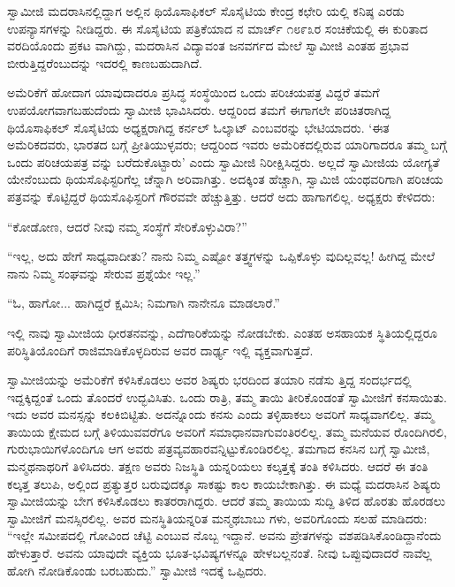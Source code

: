 ಸ್ವಾಮೀಜಿ ಮದರಾಸಿನಲ್ಲಿದ್ದಾಗ ಅಲ್ಲಿನ ಥಿಯೊಸಾಫಿಕಲ್ ಸೊಸೈಟಿಯ ಕೇಂದ್ರ ಕಛೇರಿ ಯಲ್ಲಿ ಕನಿಷ್ಠ ಎರಡು ಉಪನ್ಯಾಸಗಳನ್ನು ನೀಡಿದ್ದರು. ಈ ಸೊಸೈಟಿಯ ಪತ್ರಿಕೆಯಾದ ನ ಮಾರ್ಚ್ ೧೮೯೩ರ ಸಂಚಿಕೆಯಲ್ಲಿ ಈ ಕುರಿತಾದ ವರದಿಯೊಂದು ಪ್ರಕಟ ವಾಗಿದ್ದು, ಮದರಾಸಿನ ವಿದ್ಯಾವಂತ ಜನವರ್ಗದ ಮೇಲೆ ಸ್ವಾಮೀಜಿ ಎಂತಹ ಪ್ರಭಾವ ಬೀರುತ್ತಿದ್ದರೆಂಬುದನ್ನು ಇದರಲ್ಲಿ ಕಾಣಬಹುದಾಗಿದೆ.

ಅಮೆರಿಕೆಗೆ ಹೋದಾಗ ಯಾವುದಾದರೂ ಪ್ರಸಿದ್ಧ ಸಂಸ್ಥೆಯಿಂದ ಒಂದು ಪರಿಚಯಪತ್ರ ವಿದ್ದರೆ ತಮಗೆ ಉಪಯೋಗವಾಗಬಹುದೆಂದು ಸ್ವಾಮೀಜಿ ಭಾವಿಸಿದರು. ಆದ್ದರಿಂದ ತಮಗೆ ಈಗಾಗಲೇ ಪರಿಚಿತರಾಗಿದ್ದ ಥಿಯೊಸಾಫಿಕಲ್ ಸೊಸೈಟಿಯ ಅಧ್ಯಕ್ಷರಾಗಿದ್ದ ಕರ್ನಲ್ ಓಲ್ಕಾಟ್ ಎಂಬವರನ್ನು ಭೇಟಿಯಾದರು. ‘ಈತ ಅಮೆರಿಕದವರು, ಭಾರತದ ಬಗ್ಗೆ ಪ್ರೀತಿಯುಳ್ಳವರು; ಆದ್ದರಿಂದ ಇವರು ಅಮೆರಿಕದಲ್ಲಿರುವ ಯಾರಿಗಾದರೂ ತಮ್ಮ ಬಗ್ಗೆ ಒಂದು ಪರಿಚಯಪತ್ರ ವನ್ನು ಬರೆದುಕೊಟ್ಟಾರು’ ಎಂದು ಸ್ವಾಮೀಜಿ ನಿರೀಕ್ಷಿಸಿದ್ದರು. ಅಲ್ಲದೆ ಸ್ವಾಮೀಜಿಯ ಯೋಗ್ಯತೆ ಯೇನೆಂಬುದು ಥಿಯಸೊಫಿಸ್ಟರಿಗೆಲ್ಲ ಚೆನ್ನಾಗಿ ಅರಿವಾಗಿತ್ತು. ಅದಕ್ಕಿಂತ ಹೆಚ್ಚಾಗಿ, ಸ್ವಾಮಿಜಿ ಯಂಥವರಿಗಾಗಿ ಪರಿಚಯ ಪತ್ರವನ್ನು ಕೊಟ್ಟಿದ್ದರೆ ಥಿಯಸೊಫಿಸ್ಟರಿಗೆ ಗೌರವವೇ ಹೆಚ್ಚುತ್ತಿತ್ತು. ಆದರೆ ಅದು ಹಾಗಾಗಲಿಲ್ಲ. ಅಧ್ಯಕ್ಷರು ಕೇಳಿದರು:

“ಕೋಡೋಣ, ಆದರೆ ನೀವು ನಮ್ಮ ಸಂಸ್ಥೆಗೆ ಸೇರಿಕೊಳ್ಳುವಿರಾ?”

“ಇಲ್ಲ, ಅದು ಹೇಗೆ ಸಾಧ್ಯವಾದೀತು? ನಾನು ನಿಮ್ಮ ಎಷ್ಟೋ ತತ್ತ್ವಗಳನ್ನು ಒಪ್ಪಿಕೊಳ್ಳು ವುದಿಲ್ಲವಲ್ಲ! ಹೀಗಿದ್ದ ಮೇಲೆ ನಾನು ನಿಮ್ಮ ಸಂಘವನ್ನು ಸೇರುವ ಪ್ರಶ್ನೆಯೇ ಇಲ್ಲ.”

“ಓ, ಹಾಗೋ... ಹಾಗಿದ್ದರೆ ಕ್ಷಮಿಸಿ; ನಿಮಗಾಗಿ ನಾನೇನೂ ಮಾಡಲಾರೆ.”

ಇಲ್ಲಿ ನಾವು ಸ್ವಾಮೀಜಿಯ ಧೀರತನವನ್ನು, ಎದೆಗಾರಿಕೆಯನ್ನು ನೋಡಬೇಕು. ಎಂತಹ ಅಸಹಾಯಕ ಸ್ಥಿತಿಯಲ್ಲಿದ್ದರೂ ಪರಿಸ್ಥಿತಿಯೊಂದಿಗೆ ರಾಜಿಮಾಡಿಕೊಳ್ಳದಿರುವ ಅವರ ದಾರ್ಢ್ಯ ಇಲ್ಲಿ ವ್ಯಕ್ತವಾಗುತ್ತದೆ.

ಸ್ವಾಮೀಜಿಯನ್ನು ಅಮೆರಿಕೆಗೆ ಕಳಿಸಿಕೊಡಲು ಅವರ ಶಿಷ್ಯರು ಭರದಿಂದ ತಯಾರಿ ನಡೆಸು ತ್ತಿದ್ದ ಸಂದರ್ಭದಲ್ಲಿ ಇದ್ದಕ್ಕಿದ್ದಂತೆ ಒಂದು ತೊಂದರೆ ಉದ್ಭವಿಸಿತು. ಒಂದು ರಾತ್ರಿ, ತಮ್ಮ ತಾಯಿ ತೀರಿಕೊಂಡಂತೆ ಸ್ವಾಮೀಜಿಗೆ ಕನಸಾಯಿತು. ಇದು ಅವರ ಮನಸ್ಸನ್ನು ಕಲಕಿಬಿಟ್ಟಿತು. ಅದನ್ನೊಂದು ಕನಸು ಎಂದು ತಳ್ಳಿಹಾಕಲು ಅವರಿಗೆ ಸಾಧ್ಯವಾಗಲಿಲ್ಲ. ತಮ್ಮ ತಾಯಿಯ ಕ್ಷೇಮದ ಬಗ್ಗೆ ತಿಳಿಯುವವರೆಗೂ ಅವರಿಗೆ ಸಮಾಧಾನವಾಗುವಂತಿರಲಿಲ್ಲ. ತಮ್ಮ ಮನೆಯವ ರೊಂದಿಗಿರಲಿ, ಗುರುಭಾಯಿಗಳೊಂದಿಗೂ ಆಗ ಅವರು ಪತ್ರವ್ಯವಹಾರವನ್ನಿಟ್ಟುಕೊಂಡಿರಲಿಲ್ಲ. ತಮಗಾದ ಕನಸಿನ ಬಗ್ಗೆ ಸ್ವಾಮೀಜಿ, ಮನ್ಮಥನಾಥರಿಗೆ ತಿಳಿಸಿದರು. ತಕ್ಷಣ ಅವರು ನಿಜಸ್ಥಿತಿ ಯನ್ನರಿಯಲು ಕಲ್ಕತ್ತಕ್ಕೆ ತಂತಿ ಕಳಿಸಿದರು. ಆದರೆ ಈ ತಂತಿ ಕಲ್ಕತ್ತ ತಲುಪಿ, ಅಲ್ಲಿಂದ ಪ್ರತ್ಯುತ್ತರ ಬರುವುದಕ್ಕೂ ಸಾಕಷ್ಟು ಕಾಲ ಕಾಯಬೇಕಾಗಿತ್ತು. ಈ ಮಧ್ಯೆ ಮದರಾಸಿನ ಶಿಷ್ಯರು ಸ್ವಾಮೀಜಿಯನ್ನು ಬೇಗ ಕಳಿಸಿಕೊಡಲು ಕಾತರರಾಗಿದ್ದರು. ಆದರೆ ತಮ್ಮ ತಾಯಿಯ ಸುದ್ದಿ ತಿಳಿದ ಹೊರತು ಹೊರಡಲು ಸ್ವಾಮೀಜಿಗೆ ಮನಸ್ಸಿರಲಿಲ್ಲ. ಅವರ ಮನಸ್ಥಿತಿಯನ್ನರಿತ ಮನ್ಮಥಬಾಬು ಗಳು, ಅವರಿಗೊಂದು ಸಲಹೆ ಮಾಡಿದರು: “ಇಲ್ಲೇ ಸಮೀಪದಲ್ಲಿ ಗೋವಿಂದ ಚೆಟ್ಟಿ ಎಂಬುವ ನೊಬ್ಬ ಇದ್ದಾನೆ. ಅವನು ಪ್ರೇತಗಳನ್ನು ವಶಪಡಿಸಿಕೊಂಡಿದ್ದಾನೆಂದು ಹೇಳುತ್ತಾರೆ. ಅವನು ಯಾವುದೇ ವ್ಯಕ್ತಿಯ ಭೂತ-ಭವಿಷ್ಯಗಳನ್ನೂ ಹೇಳಬಲ್ಲನಂತೆ. ನೀವು ಒಪ್ಪುವುದಾದರೆ ನಾವೆಲ್ಲ ಹೋಗಿ ನೋಡಿಕೊಂಡು ಬರಬಹುದು.” ಸ್ವಾಮೀಜಿ ಇದಕ್ಕೆ ಒಪ್ಪಿದರು.

